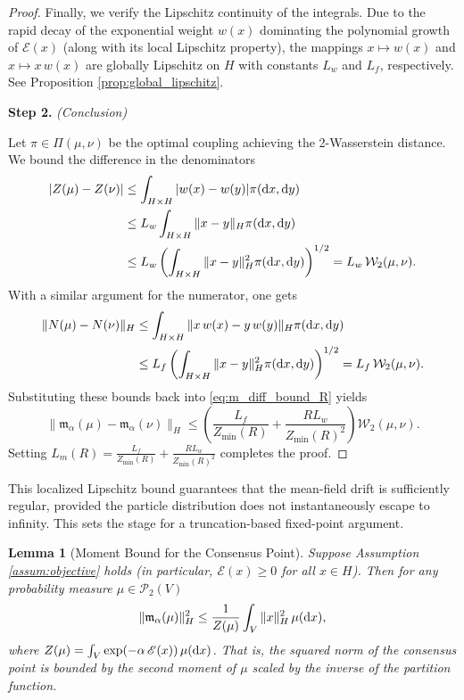 \documentclass[12pt]{amsart}
\newcommand{\D}[1]{\mbox{\rm #1}}
\newcommand{\dd}{\D{d}}
\numberwithin{equation}{section}
\newtheorem{lemma}[theorem]{Lemma}
\begin{document}
\begin{proof}
Finally, we verify the Lipschitz continuity of the integrals. Due to the rapid decay of the exponential weight $w(x)$ dominating the polynomial growth of $\mathscr{E}(x)$ (along with its local Lipschitz property), the mappings $x \mapsto w(x)$ and $x \mapsto x \,w(x)$ are globally Lipschitz on $H$ with constants $L_w$ and $L_f$, respectively. See  Proposition \ref{prop:global_lipschitz}.

\textbf{Step 2.} \textit{(Conclusion)}  

Let $\pi \in \Pi(\mu, \nu)$ be the optimal coupling achieving the 2-Wasserstein distance. We bound the difference in the denominators
\begin{align*}
    |Z(\mu) - Z(\nu)| &\leq \int_{H \times H} |w(x) - w(y)| \pi(\dd x, \dd y) \\
    &\leq L_w \int_{H \times H} \|x - y\|_H \pi(\dd x, \dd y) \\
    &\leq L_w \left( \int_{H \times H} \|x - y\|_H^2 \pi(\dd x, \dd y) \right)^{1/2} = L_w\, \mathcal{W}_2(\mu, \nu).
\end{align*}
With a similar argument for the numerator, one gets
\begin{align*}
    \|N(\mu) - N(\nu)\|_H &\leq \int_{H \times H} \|x \,w(x) - y\, w(y)\|_H \pi(\dd x, \dd y) \\
    &\leq L_f \left( \int_{H \times H} \|x - y\|_H^2 \pi(\dd x, \dd y) \right)^{1/2} = L_f \,\mathcal{W}_2(\mu, \nu).
\end{align*}
Substituting these bounds back into \eqref{eq:m_diff_bound_R} yields
\begin{equation*}
    \|\mathfrak{m}_{\alpha}(\mu) - \mathfrak{m}_{\alpha}(\nu)\|_H \leq \left( \frac{L_f}{Z_{\min}(R)} + \frac{R L_w}{Z_{\min}(R)^2} \right) \mathcal{W}_2(\mu, \nu).
\end{equation*}
Setting $L_m(R) = \frac{L_f}{Z_{\min}(R)} + \frac{R L_w}{Z_{\min}(R)^2}$ completes the proof.
\end{proof}


This localized Lipschitz bound guarantees that the mean-field drift is sufficiently regular, provided the particle distribution does not instantaneously escape to infinity. This sets the stage for a truncation-based fixed-point argument.

\begin{lemma}[Moment Bound for the Consensus Point]
\label{lem:m_alpha_moment}
Suppose Assumption \ref{assum:objective} holds (in particular, $\mathscr{E}(x) \geq 0$ for all $x \in H$). Then for any probability measure $\mu \in \mathscr{P}_2(V)$
\begin{equation*}
    \|\mathfrak{m}_\alpha(\mu)\|_H^2 \leq \frac{1}{Z(\mu)} \int_V \|x\|_H^2\, \mu(\dd x),
\end{equation*}
where $Z(\mu) = \int_V \exp(-\alpha\, \mathscr{E}(x)) \,\mu(\dd x)$. That is, the squared norm of the consensus point is bounded by the second moment of $\mu$ scaled by the inverse of the partition function.
\end{lemma}
\end{document}
